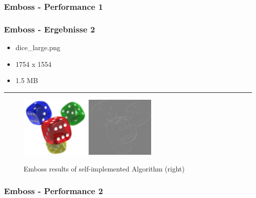 \begin{frame}
    \frametitle{Emboss - Performance 1}

    

\end{frame}

\begin{frame}
    \frametitle{Emboss - Ergebnisse 2}

    \begin{itemize}
        \item dice\_large.png
        \item 1754 x 1554
        \item 1.5 MB
    \end{itemize}

    \hfill
    \hrule
    \hfill

    \begin{figure}[H]
        \centering
    
        \includegraphics[width=0.30\textwidth]{images/dice_large.png}
        \includegraphics[width=0.30\textwidth]{images/results/emboss-my.dice_large.png}

        
        \begin{center}
            \caption{Emboss results of self-implemented Algorithm (right)}      
        \end{center}

        \label{fig:emboss2}
    \end{figure}
\end{frame}

\begin{frame}
    \frametitle{Emboss - Performance 2}

    

\end{frame}

